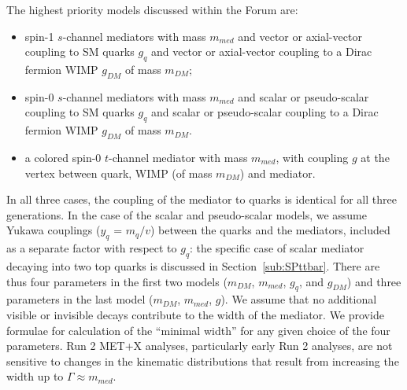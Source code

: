 \documentclass[a4,debug,notitlepage,nobib]{tufte-handout}
\begin{document}
The highest priority models discussed within the Forum are:
\begin{itemize}
\item spin-1 $s$-channel mediators with mass $m_{med}$ and vector or 
axial-vector coupling to SM quarks $g_q$ and vector or axial-vector coupling to a 
Dirac fermion WIMP $g_{DM}$ of mass $m_{DM}$;
\item spin-0 $s$-channel mediators with mass $m_{med}$ and scalar or 
pseudo-scalar coupling to SM quarks $g_q$ and scalar or pseudo-scalar coupling to a 
Dirac fermion WIMP $g_{DM}$ of mass $m_{DM}$. 
\item a colored spin-0 $t$-channel mediator with mass $m_{med}$, with 
coupling $g$ at the vertex between quark, WIMP (of mass $m_{DM}$) and mediator. 
\end{itemize}
In all three cases, the coupling of the mediator to quarks is identical for all three
generations. In the case of the scalar and pseudo-scalar 
models, we assume Yukawa couplings ($y_q$ = $m_q/v$) between the quarks and the
mediators, included as a separate factor with respect to $g_q$:
the specific case of scalar mediator decaying into two top quarks 
is discussed in Section~\ref{sub:SPttbar}. 
There are thus four parameters in the first two
models ($m_{DM}$, $m_{med}$, $g_q$, and $g_{DM}$) and three parameters
in the last model ($m_{DM}$, $m_{med}$, $g$). We assume that no
additional visible or invisible decays contribute to the width of the
mediator. We provide formulae for calculation of the ``minimal
width'' for any given choice of the four parameters. Run 2 MET+X
analyses, particularly early Run 2 analyses, are not sensitive to
changes in the kinematic distributions that result from increasing the
width up to $\Gamma \approx m_{med}$.
\end{document}
